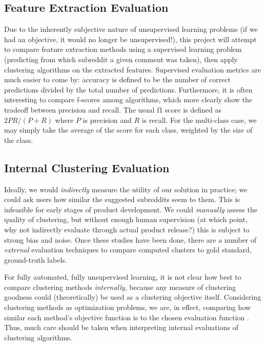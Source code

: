 \documentclass[]{article}
\begin{document}
\subsection{Feature Extraction Evaluation}
Due to the inherently subjective nature of unsupervised learning problems (if we had an objective, it would no longer be unsupervised!), this project will attempt to compare feature extraction methods using a supervised learning problem (predicting from which subreddit a given comment was taken), then apply clustering algorithms on the extracted features. Supervised evaluation metrics are much easier to come by: accuracy is defined to be the number of correct predictions divided by the total number of predictions. Furthermore, it is often interesting to compare f-scores among algorithms, which more clearly show the tradeoff between precision and recall. The usual f1 score is defined as $2 P R / (P+R)$ where $P$ is precision and $R$ is recall. For the multi-class case, we may simply take the average of the score for each class, weighted by the size of the class.

\subsection{Internal Clustering Evaluation}
Ideally, we would \emph{indirectly} measure the utility of our solution in practice; we could ask users how similar the suggested subreddits seem to them. This is infeasible for early stages of product development. We could \emph{manually} assess the quality of clustering, but without enough human supervision (at which point, why not indirectly evaluate through actual product release?) this is subject to strong bias and noise. Once these studies have been done, there are a number of \emph{external} evaluation techniques to compare computed clusters to gold standard, ground-truth labels.

For fully automated, fully unsupervised learning, it is not clear how best to compare clustering methods \emph{internally}, because any measure of clustering goodness could (theoretically) be used as a clustering objective itself. Considering clustering methods as optimization problems, we are, in effect, comparing how similar each method's objective function is to the chosen evaluation function \cite{Feldman-textmining}. Thus, much care should be taken when interpreting internal evaluations of clustering algorithms.
\end{document}
